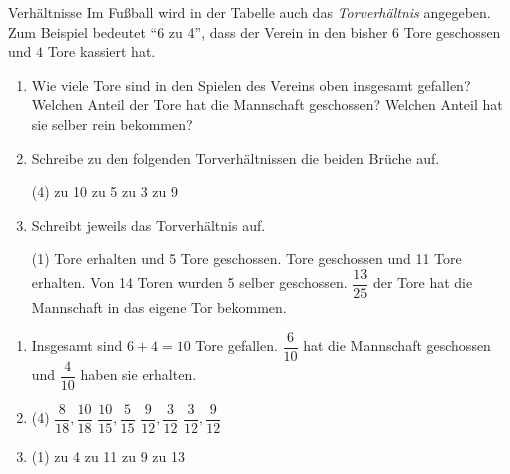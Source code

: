 \documentclass[12pt,a5paper,landscape]{scrartcl}
\begin{document}
	\begin{karte2}[\symPartner]{Verhältnisse}
		Im Fußball wird in der Tabelle auch das \emph{Torverhältnis} angegeben. Zum Beispiel bedeutet \enquote{6 zu 4}, dass der Verein in den bisher $6$ Tore geschossen und $4$ Tore kassiert hat.
		
		\begin{enumerate}
			\item Wie viele Tore sind in den Spielen des Vereins oben insgesamt gefallen? Welchen Anteil der Tore hat die Mannschaft geschossen? Welchen Anteil hat sie selber rein bekommen?
			\item Schreibe zu den folgenden Torverhältnissen die beiden Brüche auf.
				\begin{tasks}(4)
					 zu 10
					 zu 5
					 zu 3
					 zu 9
				\end{tasks}
			\item Schreibt jeweils das Torverhältnis auf.
				\begin{tasks}(1)
					 Tore erhalten und 5 Tore geschossen.
					 Tore geschossen und 11 Tore erhalten.
					\task Von 14 Toren wurden 5 selber geschossen.
					\task $\dfrac{13}{25}$ der Tore hat die Mannschaft in das eigene Tor bekommen.
				\end{tasks}
		\end{enumerate}
	\end{karte2}
	
	\begin{loesungskarte}
		\begin{enumerate}
			\item Insgesamt sind $6+4=10$ Tore gefallen. $\dfrac{6}{10}$ hat die Mannschaft geschossen und $\dfrac{4}{10}$ haben sie erhalten.
			
			\item\begin{tasks}(4)
				\task $\dfrac{8}{18}, \dfrac{10}{18}$
				\task $\dfrac{10}{15}, \dfrac{5}{15}$
				\task $\dfrac{9}{12}, \dfrac{3}{12}$
				\task $\dfrac{3}{12}, \dfrac{9}{12}$
			\end{tasks}
				
			\item\begin{tasks}(1)
				\task 5 zu 4
				\task 2 zu 11
				\task 5 zu 9
				\task 12 zu 13
			\end{tasks}
		\end{enumerate}
	\end{loesungskarte}
\end{document}
